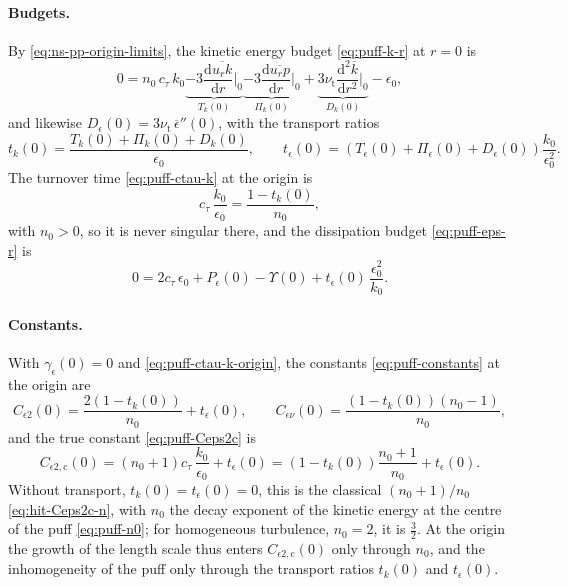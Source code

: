 \documentclass{article}
\begin{document}
\paragraph{Budgets.}
By \eqref{eq:ns-pp-origin-limits}, the kinetic energy budget
\eqref{eq:puff-k-r} at $r = 0$ is
\begin{equation}\label{eq:ns-pp-k-origin}
  0 = n_0\, c_\tau\, k_0
  \underbrace{- 3 \frac{\mathrm{d} \overline{u_r k}}{\mathrm{d} r}\bigg|_0}_{T_k(0)}
  \underbrace{- 3 \frac{\mathrm{d} \overline{u_r p}}{\mathrm{d} r}\bigg|_0}_{\Pi_k(0)}
  + \underbrace{3 \nu_{\mathrm{t}} \frac{\mathrm{d}^2 \overline{k}}{\mathrm{d} r^2}\bigg|_0}_{D_k(0)}
  - \epsilon_0 ,
\end{equation}
and likewise $D_\epsilon(0) = 3\nu_{\mathrm{t}}\, \overline{\epsilon}''(0)$,
with the transport ratios
\begin{equation}\label{eq:puff-t-origin}
  t_k(0) = \frac{T_k(0) + \Pi_k(0) + D_k(0)}{\epsilon_0} ,
  \qquad
  t_\epsilon(0) = \left( T_\epsilon(0) + \Pi_\epsilon(0) + D_\epsilon(0) \right) \frac{k_0}{\epsilon_0^2} .
\end{equation}
The turnover time \eqref{eq:puff-ctau-k} at the origin is
\begin{equation}\label{eq:puff-ctau-k-origin}
  c_\tau\, \frac{k_0}{\epsilon_0} = \frac{1 - t_k(0)}{n_0} ,
\end{equation}
with $n_0 > 0$, so it is never singular there, and the dissipation budget
\eqref{eq:puff-eps-r} is
\begin{equation}\label{eq:puff-eps-origin-ctau}
  0 = 2 c_\tau\, \epsilon_0 + P_\epsilon(0) - \Upsilon(0) + t_\epsilon(0)\, \frac{\epsilon_0^2}{k_0} .
\end{equation}

\paragraph{Constants.}
With $\gamma_\epsilon(0) = 0$ and \eqref{eq:puff-ctau-k-origin}, the
constants \eqref{eq:puff-constants} at the origin are
\begin{equation}\label{eq:puff-constants-origin}
  C_{\epsilon 2}(0) = \frac{2\left( 1 - t_k(0) \right)}{n_0} + t_\epsilon(0) ,
  \qquad
  C_{\epsilon\nu}(0) = \frac{\left( 1 - t_k(0) \right) \left( n_0 - 1 \right)}{n_0} ,
\end{equation}
and the true constant \eqref{eq:puff-Ceps2c} is
\begin{equation}\label{eq:puff-Ceps2c-origin}
  C_{\epsilon 2,\mathrm{c}}(0)
  = \left( n_0 + 1 \right) c_\tau\, \frac{k_0}{\epsilon_0} + t_\epsilon(0)
  = \left( 1 - t_k(0) \right) \frac{n_0 + 1}{n_0} + t_\epsilon(0) .
\end{equation}
Without transport, $t_k(0) = t_\epsilon(0) = 0$, this is the classical
$(n_0 + 1)/n_0$ \eqref{eq:hit-Ceps2c-n}, with $n_0$ the decay exponent of the
kinetic energy at the centre of the puff \eqref{eq:puff-n0}; for homogeneous
turbulence, $n_0 = 2$, it is $\tfrac32$. At the origin the growth of the
length scale thus enters $C_{\epsilon 2,\mathrm{c}}(0)$ only through $n_0$,
and the inhomogeneity of the puff only through the transport ratios $t_k(0)$
and $t_\epsilon(0)$.
\end{document}
